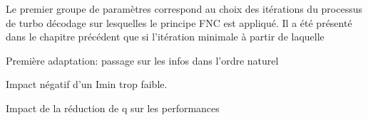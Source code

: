 Le premier groupe de paramètres correspond au choix des itérations du processus de turbo décodage sur lesquelles le 
principe FNC est appliqué. Il a été présenté dans le chapitre précédent que si l'itération minimale à partir de laquelle


Première adaptation: passage sur les infos dans l'ordre naturel

Impact négatif d'un Imin trop faible.

Impact de la réduction de q sur les performances